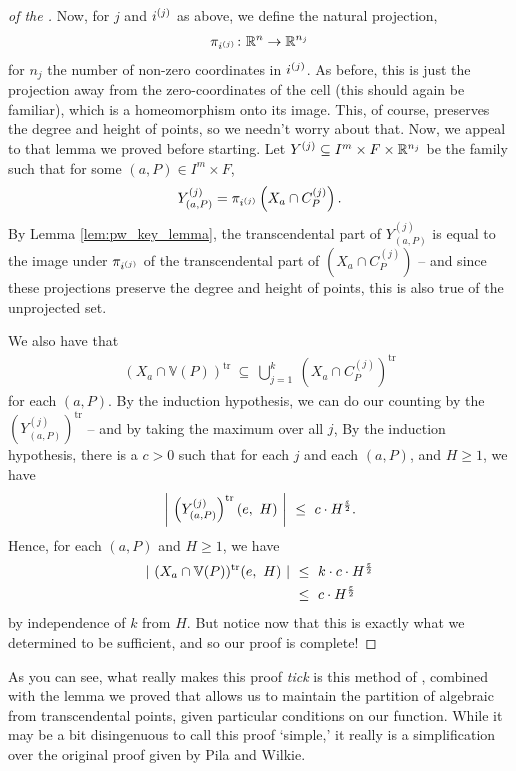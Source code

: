 \begin{proof}[of the \pwT]
    Now, for $j$ and $i^{(j)}$ as above, we define the natural projection,
    \begin{align*}
      \pi_{i^{(j)}} \colon \mathbb{R}^n \to \mathbb{R}^{n_j}
    \end{align*}
    for $n_j$ the number of non-zero coordinates in $i^{(j)}$. As before, this is just the projection away from the zero-coordinates of the cell (this should again be familiar), which is a homeomorphism onto its image. This, of course, preserves the degree and height of points, so we needn't worry about that. Now, we appeal to that lemma we proved before starting. Let $Y^{(j)} \subseteq I^m \times F \times \mathbb{R}^{n_j}$ be the  family such that for some $(a, P) \in I^m \times F$,
    \begin{align*}
      Y^{(j)}_{(a, P)} = \pi_{i^{(j)}} \left( X_a \cap C_{P}^{(j)} \right).
    \end{align*}
    By Lemma \ref{lem:pw_key_lemma}, the transcendental part of $Y^{(j)}_{(a, P)}$ is equal to the image under $\pi_{i^{(j)}}$ of the transcendental part of $\left( X_a \cap C_{P}^{(j)} \right)$ -- and since these projections preserve the degree and height of points, this is also true of the unprojected set.
    
    We also have that 
    \begin{align*}
      (X_a \cap \mathbb{V}(P))^{\textrm{tr}} \ \subseteq \ \bigcup_{j=1}^{k} \ (X_a \cap C_P^{(j)})^{\textrm{tr}}
    \end{align*}
    for each $(a, P)$. By the induction hypothesis, we can do our counting by the $(Y_{(a, P)}^{(j)})^{\textrm{tr}}$ -- and by taking the maximum over all $j$, 
    By the induction hypothesis, there is a $c > 0$ such that for each $j$ and each $(a, P)$, and $H \geq 1$, we have
    \begin{align*}
      \left\vert \ \left( Y^{(j)}_{(a, P)} \right)^{\textrm{tr}} (e, \ H) \ \right\vert \ \leq \ c \cdot H^{\frac{\eps}{2}}.
    \end{align*}
    Hence, for each $(a, P)$ and $H \geq 1$, we have
    \begin{align*}
      \card{ \  (X_a \cap \mathbb{V}(P))^{\textrm{tr}} (e, \ H) \ } \ &\leq \ k \cdot c \cdot H^{\frac{\eps}{2}} \\
                                                                      &\leq \ c \cdot H^{\frac{\eps}{2}}
    \end{align*} 
    by independence of $k$ from $H$. But notice now that this is exactly what we determined to be sufficient, and so our proof is complete!
    \smartqed
\end{proof}

As you can see, what really makes this proof \emph{tick} is this method of \sacd, combined with the lemma we proved that allows us to maintain the partition of algebraic from transcendental points, given particular conditions on our function. While it may be a bit disingenuous to call this proof `simple,' it really is a simplification over the original proof given by Pila and Wilkie. 
